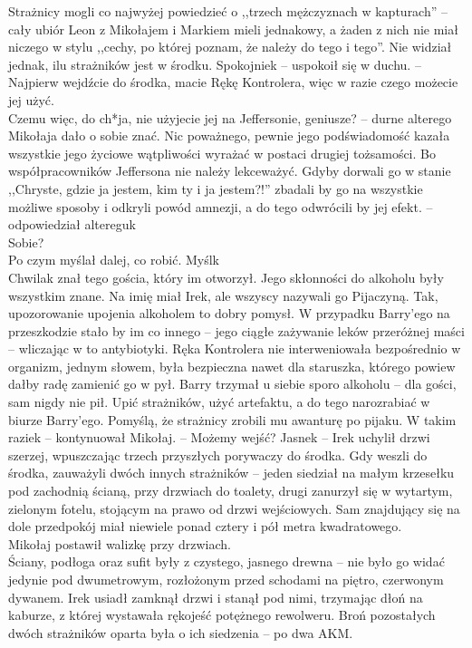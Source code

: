 \documentclass[../MAIN.tex]{subfiles}
\begin{document}
Strażnicy mogli co najwyżej powiedzieć o ,,trzech mężczyznach w kapturach'' -- cały ubiór Leon z Mikołajem i Markiem mieli jednakowy, a żaden z nich nie miał niczego w stylu ,,cechy, po której poznam, że należy do tego i tego''. Nie widział jednak, ilu strażników jest w środku. Spokojnie\3k -- uspokoił się w duchu. -- Najpierw wejdźcie do środka, macie Rękę Kontrolera, więc w razie czego możecie jej użyć. \\
Czemu więc, do ch*ja, nie użyjecie jej na Jeffersonie, geniusze? -- durne alterego Mikołaja dało o sobie znać. Nic poważnego, pewnie jego podświadomość kazała wszystkie jego życiowe wątpliwości wyrażać w postaci drugiej tożsamości.
Bo współpracowników Jeffersona nie należy lekceważyć. Gdyby dorwali go w stanie ,,Chryste, gdzie ja jestem, kim ty i ja jestem?!'' zbadali by go na wszystkie możliwe sposoby i odkryli powód amnezji, a do tego odwrócili by jej efekt. -- odpowiedział alteregu\3k \\
Sobie? \\
Po czym myślał dalej, co robić. Myśl\3k\\
Chwila\3k znał tego gościa, który im otworzył. Jego skłonności do alkoholu były wszystkim znane. Na imię miał Irek, ale wszyscy nazywali go Pijaczyną. Tak, upozorowanie upojenia alkoholem to dobry pomysł. W przypadku Barry’ego na przeszkodzie stało by im co innego -- jego ciągłe zażywanie leków przeróżnej maści -- wliczając w to antybiotyki. Ręka Kontrolera nie interweniowała bezpośrednio w organizm, jednym słowem, była bezpieczna nawet dla staruszka, którego powiew dałby radę zamienić go w pył. Barry trzymał u siebie sporo alkoholu -- dla gości, sam nigdy nie pił. Upić strażników, użyć artefaktu, a do tego narozrabiać w biurze Barry’ego.
Pomyślą, że strażnicy zrobili mu awanturę po pijaku.
\sx W takim razie\3k -- kontynuował Mikołaj. -- Możemy wejść?
\xx Jasne\3k -- Irek uchylił drzwi szerzej, wpuszczając trzech przyszłych porywaczy do środka.
\qd
Gdy weszli do środka, zauważyli dwóch innych strażników -- jeden siedział na małym krzesełku pod zachodnią ścianą, przy drzwiach do toalety, drugi zanurzył się w wytartym, zielonym fotelu, stojącym na prawo od drzwi wejściowych. Sam znajdujący się na dole przedpokój miał niewiele ponad cztery i pół metra kwadratowego. \\
Mikołaj postawił walizkę przy drzwiach. \\
Ściany, podłoga oraz sufit były z czystego, jasnego drewna -- nie było go widać jedynie pod dwumetrowym, rozłożonym przed schodami na piętro, czerwonym dywanem. Irek usiadł zamknął drzwi i stanął pod nimi, trzymając dłoń na kaburze, z której wystawała rękojeść potężnego rewolweru. Broń pozostałych dwóch strażników oparta była o ich siedzenia -- po dwa AKM.
\end{document}
